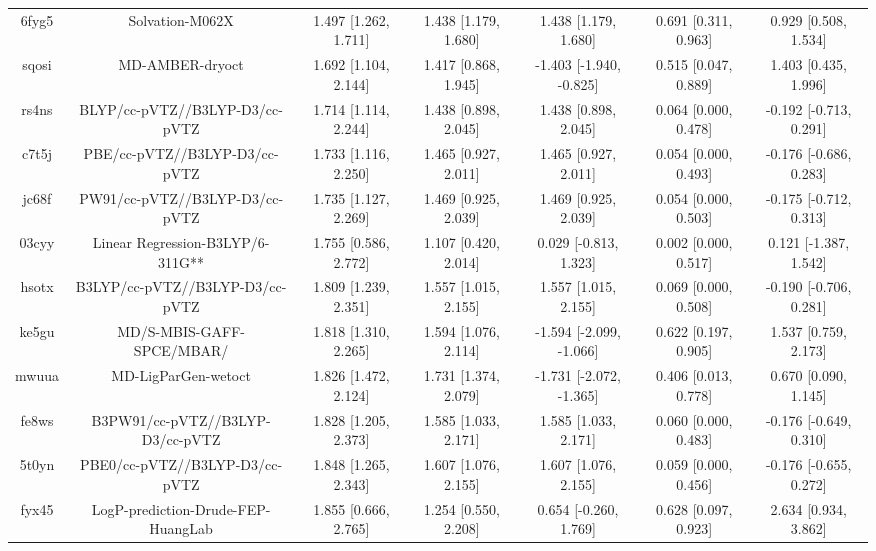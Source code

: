 \documentclass{article}
\begin{document}
\begin{center}
\begin{longtable}{|ccccccc|}
 6fyg5 &                                    Solvation-M062X &  1.497 [1.262, 1.711] &  1.438 [1.179, 1.680] &     1.438 [1.179, 1.680] &  0.691 [0.311, 0.963] &    0.929 [0.508, 1.534] \\
 sqosi &                                    MD-AMBER-dryoct &  1.692 [1.104, 2.144] &  1.417 [0.868, 1.945] &  -1.403 [-1.940, -0.825] &  0.515 [0.047, 0.889] &    1.403 [0.435, 1.996] \\
 rs4ns &                     BLYP/cc-pVTZ//B3LYP-D3/cc-pVTZ &  1.714 [1.114, 2.244] &  1.438 [0.898, 2.045] &     1.438 [0.898, 2.045] &  0.064 [0.000, 0.478] &  -0.192 [-0.713, 0.291] \\
 c7t5j &                      PBE/cc-pVTZ//B3LYP-D3/cc-pVTZ &  1.733 [1.116, 2.250] &  1.465 [0.927, 2.011] &     1.465 [0.927, 2.011] &  0.054 [0.000, 0.493] &  -0.176 [-0.686, 0.283] \\
 jc68f &                     PW91/cc-pVTZ//B3LYP-D3/cc-pVTZ &  1.735 [1.127, 2.269] &  1.469 [0.925, 2.039] &     1.469 [0.925, 2.039] &  0.054 [0.000, 0.503] &  -0.175 [-0.712, 0.313] \\
 03cyy &                   Linear Regression-B3LYP/6-311G** &  1.755 [0.586, 2.772] &  1.107 [0.420, 2.014] &    0.029 [-0.813, 1.323] &  0.002 [0.000, 0.517] &   0.121 [-1.387, 1.542] \\
 hsotx &                    B3LYP/cc-pVTZ//B3LYP-D3/cc-pVTZ &  1.809 [1.239, 2.351] &  1.557 [1.015, 2.155] &     1.557 [1.015, 2.155] &  0.069 [0.000, 0.508] &  -0.190 [-0.706, 0.281] \\
 ke5gu &                          MD/S-MBIS-GAFF-SPCE/MBAR/ &  1.818 [1.310, 2.265] &  1.594 [1.076, 2.114] &  -1.594 [-2.099, -1.066] &  0.622 [0.197, 0.905] &    1.537 [0.759, 2.173] \\
 mwuua &                                MD-LigParGen-wetoct &  1.826 [1.472, 2.124] &  1.731 [1.374, 2.079] &  -1.731 [-2.072, -1.365] &  0.406 [0.013, 0.778] &    0.670 [0.090, 1.145] \\
 fe8ws &                   B3PW91/cc-pVTZ//B3LYP-D3/cc-pVTZ &  1.828 [1.205, 2.373] &  1.585 [1.033, 2.171] &     1.585 [1.033, 2.171] &  0.060 [0.000, 0.483] &  -0.176 [-0.649, 0.310] \\
 5t0yn &                     PBE0/cc-pVTZ//B3LYP-D3/cc-pVTZ &  1.848 [1.265, 2.343] &  1.607 [1.076, 2.155] &     1.607 [1.076, 2.155] &  0.059 [0.000, 0.456] &  -0.176 [-0.655, 0.272] \\
 fyx45 &                 LogP-prediction-Drude-FEP-HuangLab &  1.855 [0.666, 2.765] &  1.254 [0.550, 2.208] &    0.654 [-0.260, 1.769] &  0.628 [0.097, 0.923] &    2.634 [0.934, 3.862] \\

\end{longtable}
\end{center}
\end{document}
